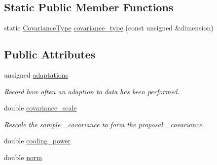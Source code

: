 \subsection*{Static Public Member Functions}
\begin{DoxyCompactItemize}
\item 
static \hyperlink{classeos_1_1hdf5_1_1Array}{CovarianceType} \hyperlink{classeos_1_1proposal__functions_1_1Multivariate_a4b7778284ee0ba2ea1ff85df8844da6e}{covariance\_\-type} (const unsigned \&dimension)
\end{DoxyCompactItemize}
\subsection*{Public Attributes}
\begin{DoxyCompactItemize}
\item 
unsigned \hyperlink{classeos_1_1proposal__functions_1_1Multivariate_a67c47eeeefc2f0027cab513f50a402a2}{adaptations}
\begin{DoxyCompactList}\small\item\em Record how often an adaption to data has been performed. \item\end{DoxyCompactList}\item 
double \hyperlink{classeos_1_1proposal__functions_1_1Multivariate_ab52678a7403bae09d3db8f2247c02e17}{covariance\_\-scale}
\begin{DoxyCompactList}\small\item\em Rescale the sample \_\-covariance to form the proposal \_\-covariance. \item\end{DoxyCompactList}\item 
double \hyperlink{classeos_1_1proposal__functions_1_1Multivariate_aabab67ba765f532effe6dd8236d69cdd}{cooling\_\-power}
\item 
double \hyperlink{classeos_1_1proposal__functions_1_1Multivariate_a6ca72be11badd000f8d36a80c131b5d4}{norm}
\end{DoxyCompactItemize}
